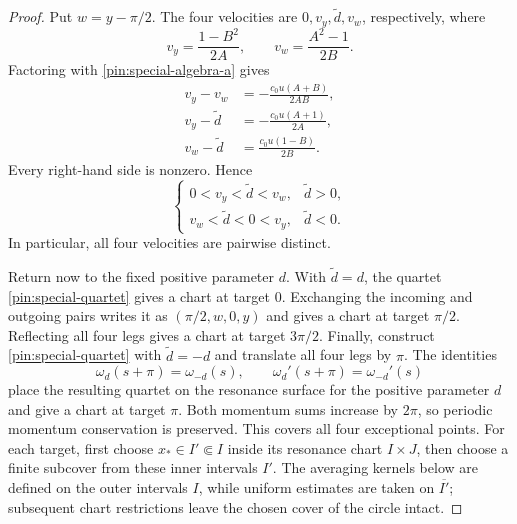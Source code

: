 \begin{proof}
Put $w=y-\pi/2$. The four velocities are
$0,v_y,\widetilde d,v_w$, respectively, where
\begin{equation}
              v_y=\frac{1-B^2}{2A},\qquad
              v_w=\frac{A^2-1}{2B}.
 \label{pin:special-velocities}
\end{equation}
Factoring with \eqref{pin:special-algebra-a} gives
\begin{equation}
 \begin{aligned}
 v_y-v_w&=-\frac{c_0u(A+B)}{2AB},\\
 v_y-\widetilde d&=-\frac{c_0u(A+1)}{2A},\\
 v_w-\widetilde d&=\frac{c_0u(1-B)}{2B}.
 \end{aligned}
 \label{pin:velocity-differences}
\end{equation}
Every right-hand side is nonzero. Hence
\begin{equation}
 \begin{cases}
 0<v_y<\widetilde d<v_w,&\widetilde d>0,\\
 v_w<\widetilde d<0<v_y,&\widetilde d<0.
 \end{cases}
 \label{pin:velocity-order}
\end{equation}
In particular, all four velocities are pairwise distinct.

Return now to the fixed positive parameter $d$. With $\widetilde d=d$,
the quartet \eqref{pin:special-quartet} gives a chart at target $0$.
Exchanging the incoming and outgoing pairs writes it as
$(\pi/2,w,0,y)$ and gives a chart at target $\pi/2$. Reflecting all
four legs gives a chart at target $3\pi/2$. Finally, construct
\eqref{pin:special-quartet} with $\widetilde d=-d$ and translate all
four legs by $\pi$. The identities
\begin{equation}
          \omega_d(s+\pi)=\omega_{-d}(s),\qquad
          \omega_d'(s+\pi)=\omega_{-d}'(s)
 \label{pin:parameter-shift}
\end{equation}
place the resulting quartet on the resonance surface for the positive
parameter $d$ and give a chart at target $\pi$. Both momentum sums
increase by $2\pi$, so periodic momentum conservation is preserved.
This covers all four exceptional points. For each target, first choose
$x_*\in I'\Subset I$ inside its resonance chart $I\times J$, then
choose a finite subcover from these inner intervals $I'$. The averaging
kernels below are defined on the outer intervals $I$, while uniform
estimates are taken on $\overline{I'}$; subsequent chart restrictions
leave the chosen cover of the circle intact.
\end{proof}

